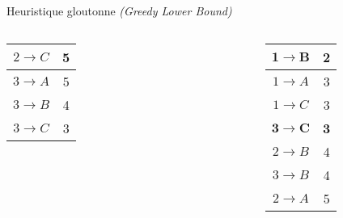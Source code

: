\begin{frame}{Heuristique gloutonne \textit{(Greedy Lower Bound)}}
{\begin{columns}
\begin{column}{0.2\textwidth}
\begin{center}
\begin{tabular}{ | c | c | }
                                \hline
                                $2 \rightarrow C$ & 5 \\
                                \hline
                                $3 \rightarrow A$ & 5 \\
                                \hline
                                $3 \rightarrow B$ & 4 \\
                                \hline
                                $3 \rightarrow C$ & 3 \\
                                \hline
                            \end{tabular}
                        \end{center}
                    \end{column}
                    \begin{column}{0.1\textwidth}
                        \begin{center}
                        \end{center}
                    \end{column}
                    \begin{column}{0.2\textwidth}
                        \begin{center}
                            \begin{tabular}{ | c | c | }
                                \hline
                                $\mathbf{1 \rightarrow B}$ & \textbf{2} \\
                                \hline
                                $1 \rightarrow A$ & 3 \\
                                \hline
                                $1 \rightarrow C$ & 3 \\
                                \hline
                                $\mathbf{3 \rightarrow C}$ & \textbf{3} \\
                                \hline
                                $2 \rightarrow B$ & 4 \\
                                \hline
                                $3 \rightarrow B$ & 4 \\
                                \hline
                                $2 \rightarrow A$ & 5 \\

\end{tabular}
\end{center}
\end{column}
\end{columns}}
\end{frame}
